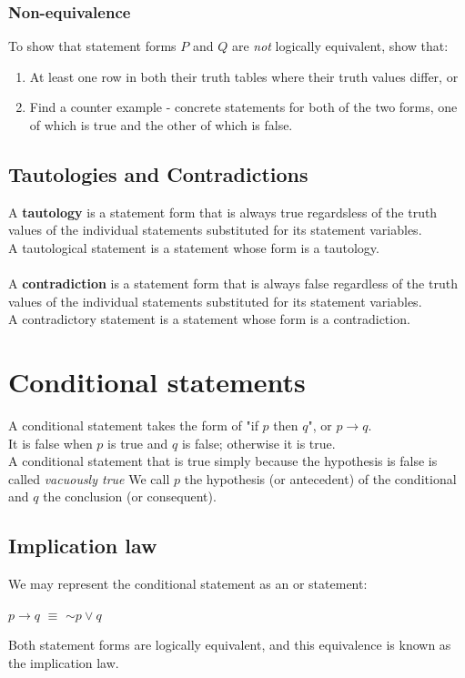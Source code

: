\documentclass[a4paper]{article}
\begin{document}
\subsubsection{Non-equivalence}
To show that statement forms $P$ and $Q$ are \textit{not} logically equivalent, show that:
\begin{enumerate}
	\item At least one row in both their truth tables where their truth values differ, or
	\item Find a counter example - concrete statements for both of the two forms, one of which is true and the other of which is false. 
\end{enumerate}
\subsection{Tautologies and Contradictions}
A \textbf{tautology} is a statement form that is always true regardsless of the truth values of the individual statements substituted for its statement variables.\\
A tautological statement is a statement whose form is a tautology.\\ \\
A \textbf{contradiction} is a statement form that is always false regardless of the truth values of the individual statements substituted for its statement variables.\\
A contradictory statement is a statement whose form is a contradiction.
\section{Conditional statements}
A conditional statement takes the form of "if $p$ then $q$", or $p \rightarrow q$.\\
It is false when $p$ is true and $q$ is false; otherwise it is true.\\

A conditional statement that is true simply because the hypothesis is false is called \textit{vacuously true}
We call $p$ the hypothesis (or antecedent) of the conditional and $q$ the conclusion (or consequent).
\subsection{Implication law}
We may represent the conditional statement as an or statement:
\begin{center}
	$p \rightarrow q$ $\equiv$ $\sim p \lor q$
\end{center}
Both statement forms are logically equivalent, and this equivalence is known as the implication law.
\end{document}
